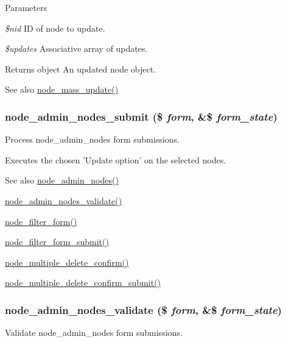 \begin{DoxyParams}{Parameters}
\item[{\em \$nid}]ID of node to update. \item[{\em \$updates}]Associative array of updates.\end{DoxyParams}
\begin{DoxyReturn}{Returns}
object An updated node object.
\end{DoxyReturn}
\begin{DoxySeeAlso}{See also}
\hyperlink{node_8admin_8inc_ab40a38d08f170c418b0dac544d8ba97c}{node\_\-mass\_\-update()} 
\end{DoxySeeAlso}
\hypertarget{node_8admin_8inc_a5f159cfed0d6cce65d5d70747efec391}{
\subsubsection[{node\_\-admin\_\-nodes\_\-submit}]{\setlength{\rightskip}{0pt plus 5cm}node\_\-admin\_\-nodes\_\-submit (\$ {\em form}, \/  \&\$ {\em form\_\-state})}}
\label{node_8admin_8inc_a5f159cfed0d6cce65d5d70747efec391}
Process node\_\-admin\_\-nodes form submissions.

Executes the chosen 'Update option' on the selected nodes.

\begin{DoxySeeAlso}{See also}
\hyperlink{group__forms_ga3fb56c702a3c16eddd2fcd8ccd3e4adb}{node\_\-admin\_\-nodes()} 

\hyperlink{node_8admin_8inc_a32a9ea91250aaf84de44f784a3569944}{node\_\-admin\_\-nodes\_\-validate()} 

\hyperlink{group__forms_ga2b7edb82b488db11ffde4fa60958004d}{node\_\-filter\_\-form()} 

\hyperlink{node_8admin_8inc_a346f00ebb9b4aae36025623d893c5061}{node\_\-filter\_\-form\_\-submit()} 

\hyperlink{group__forms_ga25cc06a5aa3aa17eadc5a8a97e7c5e9e}{node\_\-multiple\_\-delete\_\-confirm()} 

\hyperlink{node_8admin_8inc_ab8a2e11edeef2797ca739f94d1eb1af9}{node\_\-multiple\_\-delete\_\-confirm\_\-submit()} 
\end{DoxySeeAlso}
\hypertarget{node_8admin_8inc_a32a9ea91250aaf84de44f784a3569944}{
\subsubsection[{node\_\-admin\_\-nodes\_\-validate}]{\setlength{\rightskip}{0pt plus 5cm}node\_\-admin\_\-nodes\_\-validate (\$ {\em form}, \/  \&\$ {\em form\_\-state})}}
\label{node_8admin_8inc_a32a9ea91250aaf84de44f784a3569944}
Validate node\_\-admin\_\-nodes form submissions.

